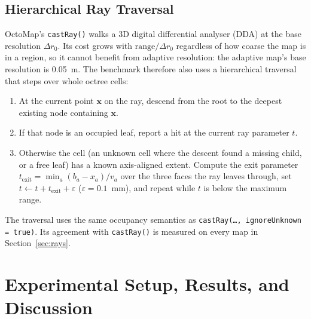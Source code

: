 \documentclass[11pt,a4paper]{report}
\begin{document}
\section{Hierarchical Ray Traversal}
OctoMap's \texttt{castRay()} walks a 3D digital differential analyser (DDA) at the base resolution $\Delta r_0$. Its cost grows with $\text{range}/\Delta r_0$ regardless of how coarse the map is in a region, so it cannot benefit from adaptive resolution: the adaptive map's base resolution is 0.05~m. The benchmark therefore also uses a hierarchical traversal that steps over whole octree cells:
\begin{enumerate}
    \item At the current point $\mathbf{x}$ on the ray, descend from the root to the deepest existing node containing $\mathbf{x}$.
    \item If that node is an occupied leaf, report a hit at the current ray parameter $t$.
    \item Otherwise the cell (an unknown cell where the descent found a missing child, or a free leaf) has a known axis-aligned extent. Compute the exit parameter $t_{\text{exit}} = \min_a (b_a - x_a)/v_a$ over the three faces the ray leaves through, set $t \gets t + t_{\text{exit}} + \varepsilon$ ($\varepsilon = 0.1$~mm), and repeat while $t$ is below the maximum range.
\end{enumerate}
The traversal uses the same occupancy semantics as \texttt{castRay(\dots, ignoreUnknown = true)}. Its agreement with \texttt{castRay()} is measured on every map in Section~\ref{sec:rays}.

\newpage

\chapter{Experimental Setup, Results, and Discussion}
\end{document}
